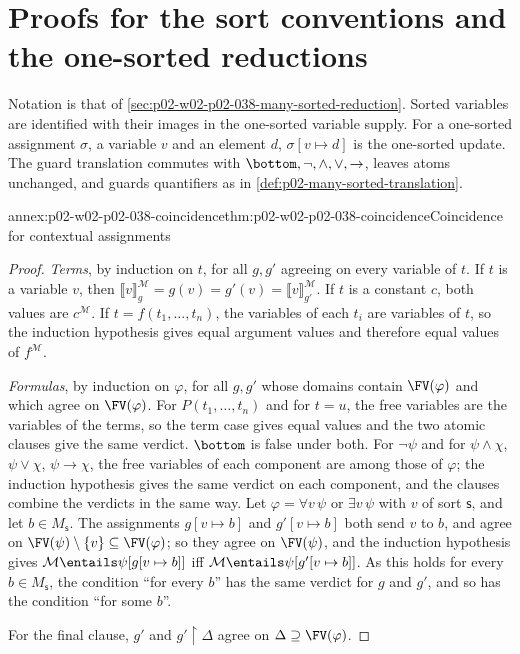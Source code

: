 \section{Proofs for the sort conventions and the one-sorted reductions}
\label{sec:annex-p02-w02-p02-038-many-sorted-reduction}

Notation is that of \cref{sec:p02-w02-p02-038-many-sorted-reduction}.  Sorted
variables are identified with their images in the one-sorted variable
supply.  For a one-sorted assignment \(\sigma\), a variable \(v\) and an
element \(d\), \(\sigma[v\mapsto d]\) is the one-sorted update.  The guard
translation commutes with \(\bottom,\neg,\land,\lor,\to\), leaves atoms
unchanged, and guards quantifiers as in
\cref{def:p02-many-sorted-translation}.

\begin{annexitem}{annex:p02-w02-p02-038-coincidence}{thm:p02-w02-p02-038-coincidence}{Coincidence for contextual assignments}
\begin{proof}
\emph{Terms}, by induction on \(t\), for all \(g,g'\) agreeing on every
variable of \(t\).  If \(t\) is a variable \(v\), then
\(\llbracket v\rrbracket^{\mathcal M}_{g}=g(v)=g'(v)=
\llbracket v\rrbracket^{\mathcal M}_{g'}\).  If \(t\) is a constant \(c\),
both values are \(c^{\mathcal M}\).  If \(t=f(t_1,\ldots,t_n)\), the
variables of each \(t_i\) are variables of \(t\), so the induction hypothesis
gives equal argument values and therefore equal values of \(f^{\mathcal M}\).

\emph{Formulas}, by induction on \(\varphi\), for all \(g,g'\) whose domains
contain \(\FV(\varphi)\) and which agree on \(\FV(\varphi)\).  For
\(P(t_1,\ldots,t_n)\) and for \(t=u\), the free variables are the variables
of the terms, so the term case gives equal values and the two atomic clauses
give the same verdict.  \(\bottom\) is false under both.  For \(\neg\psi\)
and for \(\psi\land\chi\), \(\psi\lor\chi\), \(\psi\to\chi\), the free
variables of each component are among those of \(\varphi\); the induction
hypothesis gives the same verdict on each component, and the clauses combine
the verdicts in the same way.  Let \(\varphi=\forall v\,\psi\) or
\(\exists v\,\psi\) with \(v\) of sort \(\mathsf s\), and let
\(b\in M_{\mathsf s}\).  The assignments \(g[v\mapsto b]\) and
\(g'[v\mapsto b]\) both send \(v\) to \(b\), and agree on
\(\FV(\psi)\setminus\{v\}\subseteq\FV(\varphi)\); so they agree on
\(\FV(\psi)\), and the induction hypothesis gives
\(\mathcal M\entails\psi[g[v\mapsto b]]\) iff
\(\mathcal M\entails\psi[g'[v\mapsto b]]\).  As this holds for every
\(b\in M_{\mathsf s}\), the condition ``for every \(b\)'' has the same verdict
for \(g\) and \(g'\), and so has the condition ``for some \(b\)''.

For the final clause, \(g'\) and \(g'{\restriction}\Delta\) agree on
\(\Delta\supseteq\FV(\varphi)\).
\end{proof}
\end{annexitem}

